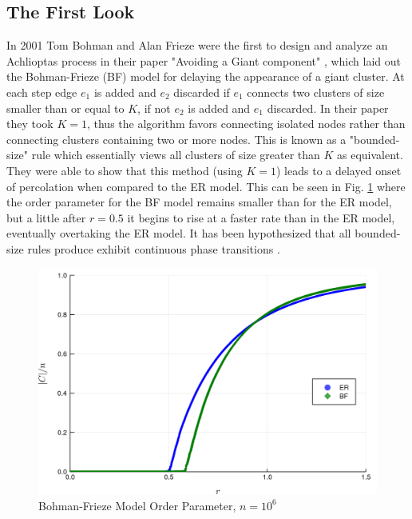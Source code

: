\subsection{The First Look}
In 2001 Tom Bohman and Alan Frieze were the first to design and analyze an Achlioptas process in their paper "Avoiding a Giant component" \cite{BF}, which laid out the Bohman-Frieze (BF) model for delaying the appearance of a giant cluster.
At each step edge $e_1$ is added and $e_2$ discarded if $e_1$ connects two clusters of size smaller than or equal to $K$, if not $e_2$ is added and $e_1$ discarded.
In their paper they took $K = 1$, thus the algorithm favors connecting isolated nodes rather than connecting clusters containing two or more nodes.
This is known as a "bounded-size" rule which essentially views all clusters of size greater than $K$ as equivalent.
They were able to show that this method (using $K = 1$) leads to a delayed onset of percolation when compared to the ER model.
This can be seen in Fig. \ref{fig:ER_BF_transition} where the order parameter for the BF model remains smaller than for the ER model, but a little after $r = 0.5$ it begins to rise at a faster rate than in the ER model, eventually overtaking the ER model.
It has been hypothesized that all bounded-size rules produce exhibit continuous phase transitions \cite{Spencer_Wormald}.

\begin{figure}[H]
	\centering
	\includegraphics[width=350pt]{images/ER_BF_1e6_order_param.png}
	\caption{Bohman-Frieze Model Order Parameter, $n = 10^6$}
	\label{fig:ER_BF_transition}
\end{figure}









